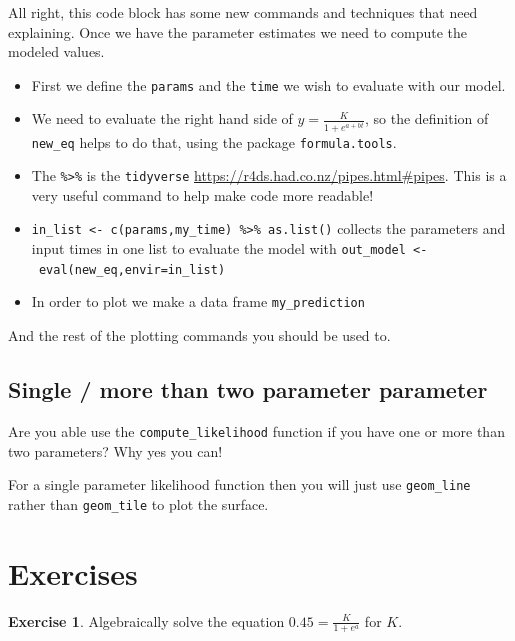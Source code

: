 \documentclass[
]{book}
\providecommand{\tightlist}{%
  \setlength{\itemsep}{0pt}\setlength{\parskip}{0pt}}
\theoremstyle{definition}
\theoremstyle{definition}
\theoremstyle{definition}
\newtheorem{exercise}{Exercise}[chapter]
\theoremstyle{remark}
\begin{document}
All right, this code block has some new commands and techniques that need explaining. Once we have the parameter estimates we need to compute the modeled values.

\begin{itemize}
\tightlist
\item
  First we define the \texttt{params} and the \texttt{time} we wish to evaluate with our model.
\item
  We need to evaluate the right hand side of \(\displaystyle y = \frac{K}{1+e^{a+bt}}\), so the definition of \texttt{new\_eq} helps to do that, using the package \texttt{formula.tools}.
\item
  The \texttt{\%\textgreater{}\%} is the \texttt{tidyverse} \href{pipe}{https://r4ds.had.co.nz/pipes.html\#pipes}. This is a very useful command to help make code more readable!
\item
  \texttt{in\_list\ \textless{}-\ c(params,my\_time)\ \%\textgreater{}\%\ as.list()} collects the parameters and input times in one list to evaluate the model with \texttt{out\_model\ \textless{}-\ eval(new\_eq,envir=in\_list)}
\item
  In order to plot we make a data frame \texttt{my\_prediction}
\end{itemize}

And the rest of the plotting commands you should be used to.

\hypertarget{single-more-than-two-parameter-parameter}{%
\subsection{Single / more than two parameter parameter}\label{single-more-than-two-parameter-parameter}}

Are you able use the \texttt{compute\_likelihood} function if you have one or more than two parameters? Why yes you can!

For a single parameter likelihood function then you will just use \texttt{geom\_line} rather than \texttt{geom\_tile} to plot the surface.

\newpage

\hypertarget{exercises-8}{%
\section{Exercises}\label{exercises-8}}

\begin{exercise}
\protect\hypertarget{exr:solve-gause}{}{\label{exr:solve-gause} }Algebraically solve the equation \(\displaystyle 0.45 = \frac{K}{1+e^{a}}\) for \(K\).
\end{exercise}
\end{document}
